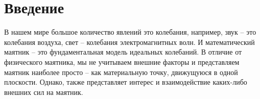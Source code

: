 \section{Введение}
    В нашем мире большое количество явлений это колебания, например, звук -- это колебания воздуха, свет -- колебания электромагнитных волн. И математический маятник -- это фундаментальная модель идеальных колебаний. В отличие от физического маятника, мы не учитываем внешние факторы и представляем маятник наиболее просто -- как материальную точку, движущуюся в одной плоскости. Однако, также представляет интерес и взаимодействие каких-либо внешних сил на маятник.